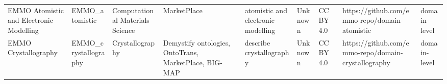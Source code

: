 \begin{tabular}{m{5cm}m{2cm}m{5cm}m{2cm}m{2cm}m{2cm}m{2cm}m{2cm}m{2cm}}
                                          EMMO Atomistic and Electronic Modelling &          EMMO_atomistic &             Computational Materials Science &                                                                                                                                                                                                                                                                                                                                                          MarketPlace &                                                                                                                                                                                                                                                                                                                                                                     atomistic and electronic modelling &                                                                                                            Unknown &                                    CC BY 4.0 &                                                     https://github.com/emmo-repo/domain-atomistic  &      domain-level \\
                                                             EMMO Crystallography &    EMMO_crystallography &                             Crystallography &                                                                                                                                                                                                                                                                                                                Demystify ontologies, OntoTrans, MarketPlace, BIG-MAP &                                                                                                                                                                                                                                                                                                                                                                               describe crystallography &                                                                                                            Unknown &                                    CC BY 4.0 &                                               https://github.com/emmo-repo/domain-crystallography  &      domain-level \\

\end{tabular}
